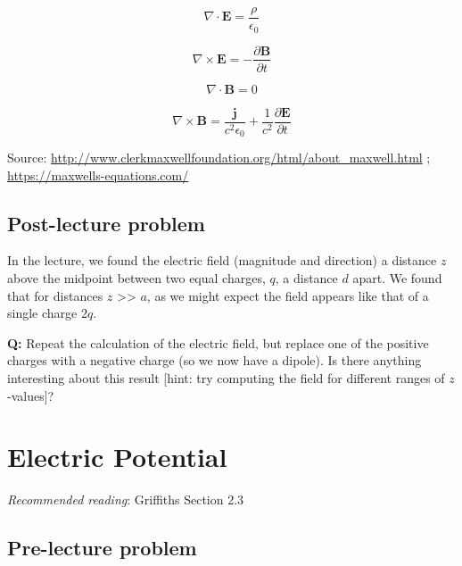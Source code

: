 \documentclass[
  letterpaper,
  DIV=11,
  numbers=noendperiod]{scrreprt}
\begin{document}
\begin{equation}

\nabla \cdot \mathbf{E} = \frac{\rho}{\epsilon_0}
\end{equation}

\begin{equation}
\nabla \times \mathbf{E} = - \frac{\partial \mathbf{B}}{\partial t} 
\end{equation}

\begin{equation}
\nabla \cdot \mathbf{B} = 0
\end{equation}

\begin{equation}
\nabla \times \mathbf{B} = \frac{\mathbf{j}}{c^2 \epsilon_0} + \frac{1}{c^2} \frac{\partial \mathbf{E}}{\partial t}
\end{equation}

Source:
\url{http://www.clerkmaxwellfoundation.org/html/about_maxwell.html} ;
\url{https://maxwells-equations.com/}

\section{Post-lecture problem}\label{post-lecture-problem}

In the lecture, we found the electric field (magnitude and direction) a
distance \(z\) above the midpoint between two equal charges, \(q\), a
distance \(d\) apart. We found that for distances \(z\)
\textgreater\textgreater{} \(a\), as we might expect the field appears
like that of a single charge \(2q\).

\textbf{Q:} Repeat the calculation of the electric field, but replace
one of the positive charges with a negative charge (so we now have a
dipole). Is there anything interesting about this result {[}hint: try
computing the field for different ranges of \(z\)-values{]}?


\chapter{Electric Potential}\label{electric-potential}

\emph{Recommended reading}: Griffiths Section 2.3

\section{Pre-lecture problem}\label{pre-lecture-problem-1}
\end{document}

